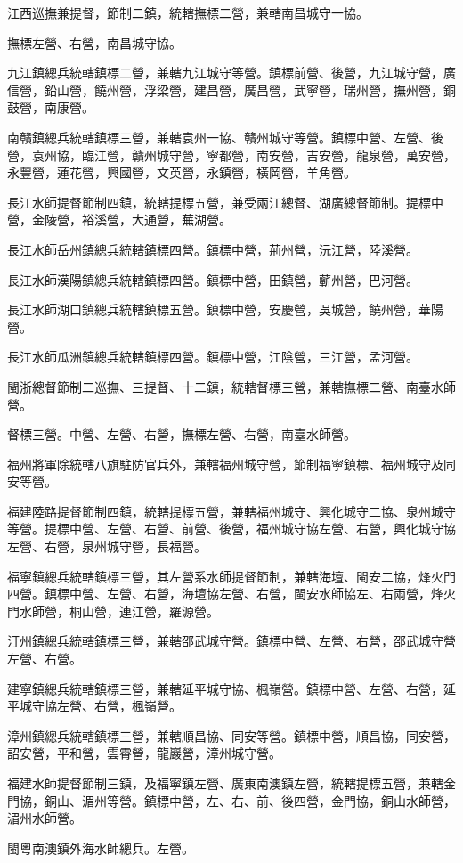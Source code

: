 \begin{pinyinscope}
江西巡撫兼提督，節制二鎮，統轄撫標二營，兼轄南昌城守一協。

撫標左營、右營，南昌城守協。

九江鎮總兵統轄鎮標二營，兼轄九江城守等營。鎮標前營、後營，九江城守營，廣信營，鉛山營，饒州營，浮梁營，建昌營，廣昌營，武寧營，瑞州營，撫州營，銅鼓營，南康營。

南贛鎮總兵統轄鎮標三營，兼轄袁州一協、贛州城守等營。鎮標中營、左營、後營，袁州協，臨江營，贛州城守營，寧都營，南安營，吉安營，龍泉營，萬安營，永豐營，蓮花營，興國營，文英營，永鎮營，橫岡營，羊角營。

長江水師提督節制四鎮，統轄提標五營，兼受兩江總督、湖廣總督節制。提標中營，金陵營，裕溪營，大通營，蕪湖營。

長江水師岳州鎮總兵統轄鎮標四營。鎮標中營，荊州營，沅江營，陸溪營。

長江水師漢陽鎮總兵統轄鎮標四營。鎮標中營，田鎮營，蘄州營，巴河營。

長江水師湖口鎮總兵統轄鎮標五營。鎮標中營，安慶營，吳城營，饒州營，華陽營。

長江水師瓜洲鎮總兵統轄鎮標四營。鎮標中營，江陰營，三江營，孟河營。

閩浙總督節制二巡撫、三提督、十二鎮，統轄督標三營，兼轄撫標二營、南臺水師營。

督標三營。中營、左營、右營，撫標左營、右營，南臺水師營。

福州將軍除統轄八旗駐防官兵外，兼轄福州城守營，節制福寧鎮標、福州城守及同安等營。

福建陸路提督節制四鎮，統轄提標五營，兼轄福州城守、興化城守二協、泉州城守等營。提標中營、左營、右營、前營、後營，福州城守協左營、右營，興化城守協左營、右營，泉州城守營，長福營。

福寧鎮總兵統轄鎮標三營，其左營系水師提督節制，兼轄海壇、閩安二協，烽火門四營。鎮標中營、左營、右營，海壇協左營、右營，閩安水師協左、右兩營，烽火門水師營，桐山營，連江營，羅源營。

汀州鎮總兵統轄鎮標三營，兼轄邵武城守營。鎮標中營、左營、右營，邵武城守營左營、右營。

建寧鎮總兵統轄鎮標三營，兼轄延平城守協、楓嶺營。鎮標中營、左營、右營，延平城守協左營、右營，楓嶺營。

漳州鎮總兵統轄鎮標三營，兼轄順昌協、同安等營。鎮標中營，順昌協，同安營，詔安營，平和營，雲霄營，龍巖營，漳州城守營。

福建水師提督節制三鎮，及福寧鎮左營、廣東南澳鎮左營，統轄提標五營，兼轄金門協，銅山、湄州等營。鎮標中營，左、右、前、後四營，金門協，銅山水師營，湄州水師營。

閩粵南澳鎮外海水師總兵。左營。


\end{pinyinscope}
